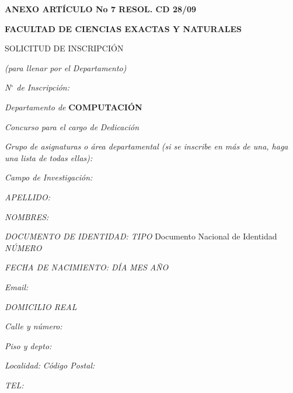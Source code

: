 \documentclass{article}
\newcommand{\cargo}[2]{\noindent \textit{Concurso para el cargo de} \MakeUppercase{\textbf{#1}} \hspace{0.5cm} \textit{Dedicación} \MakeUppercase{\textbf{#2}}}
\newcommand{\areas}[3]{\noindent \textit{Grupo de asignaturas o área departamental (si se inscribe en más de una, haga una lista de todas ellas):}

\medskip

\noindent \MakeUppercase{\textbf{#1}}
\ifthenelse{\equal{#2}{}}{}{\MakeUppercase{\textbf{, {#2}}}}
\ifthenelse{\equal{#3}{}}{}{\MakeUppercase{\textbf{, {#3}}}}
}
\newcommand{\apellido}[1]{\noindent \textit{APELLIDO:} \MakeUppercase{\textbf{#1}}}
\newcommand{\nombre}[1]{\noindent \textit{NOMBRES:} \MakeUppercase{\textbf{#1}}}
\newcommand{\dni}[1]{\noindent \textit{DOCUMENTO DE IDENTIDAD: TIPO} Documento Nacional de Identidad \hspace{0.25cm} \textit{NÚMERO} \textbf{#1}}
\newcommand{\fechaNacimiento}[3]{\noindent \textit{FECHA DE NACIMIENTO: DÍA} \textbf{#1} \hspace{0.1cm} \textit{MES} \textbf{#2} {\hspace{0.1cm}} \textit{AÑO} \textbf{#3}}
\newcommand{\domicilio}[5]{\noindent \textit{Calle y número:} \MakeUppercase{\textbf{#1}}

\noindent \textit{Piso y depto:} \MakeUppercase{\textbf{#2}}

\noindent \textit{Localidad:} \MakeUppercase{\textbf{#3}} {\hspace{3cm}} \textit{Código Postal:} \textbf{#4}

\noindent \textit{TEL:} \textbf{#5}
}
\newcommand{\email}[1]{\noindent \textit{Email:} \MakeUppercase{\textbf{#1}}}
\begin{document}
\begin{center}
{\bf ANEXO ARTÍCULO No 7 RESOL. CD 28/09}
\end{center}
{\bf \noindent FACULTAD DE CIENCIAS EXACTAS Y NATURALES

\noindent SOLICITUD DE INSCRIPCIÓN}

\bigskip

\noindent \textit{(para llenar por el Departamento)}

\bigskip

\noindent \textit{N$^\circ$ de Inscripción:} \hdashrule{4cm}{0.5pt}{0.75pt}

\medskip

\noindent \textit{Departamento de} \MakeUppercase{\textbf{Computación}}

\cargo
  {\cargoConcurso}
  {\dedicacionConcurso}

\areas{\primerAreaQueConcursa}{\segundaAreaQueConcursa}{\tercerAreaQueConcursa}

\medskip

\noindent \hdashrule{\linewidth}{0.5pt}{0.75pt}

\noindent \textit{Campo de Investigación:}

\medskip

\noindent \hdashrule{\linewidth}{0.5pt}{0.75pt}

\medskip

\noindent \hdashrule{\linewidth}{0.5pt}{0.75pt}

\medskip

\noindent \hdashrule{\linewidth}{0.5pt}{0.75pt}

\medskip

\noindent \hrulefill

\bigskip

\apellido{\apellidoDelAspirante}

\medskip

\nombre{\nombresDelAspirante}

\medskip

\dni{\numeroDocumentoDeIdentidadDelAspirante}

\medskip

\fechaNacimiento{\numeroDiaNacimientoDelAspirante}{\numeroMesNacimientoDelAspirante}{\anioNacimientoDelAspirante}

\medskip

\email{\emailDelAspirante}

\bigskip

\noindent \textit{DOMICILIO REAL}

\domicilio{\direccionDelDomicilioDelAspirante}{\pisoDelDomicilioDelAspirante}{\localidadDelDomicilioDelAspirante}{\codigoPostalDelDomicilioDelAspirante}{\telefonoDelDomicilioDelAspirante}
\end{document}

